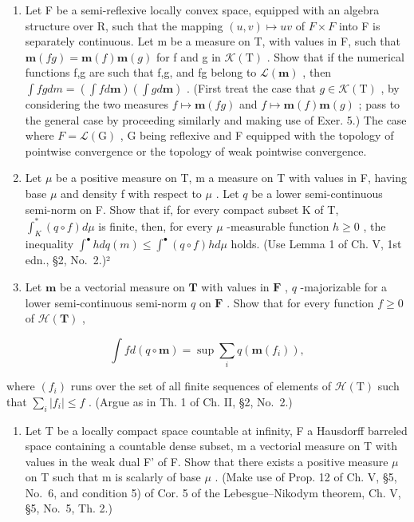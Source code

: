 \begin{enumerate}
\item
  Let F be a semi-reflexive locally convex space, equipped with an algebra structure over R, such that the mapping \((u,v)\mapsto uv\) of \(F\times F\) into F is separately continuous. Let m be a measure on T, with values in F, such that \(\mathbf{m}(fg)=\mathbf{m}(f)\mathbf{m}(g)\) for f and g in \(\mathcal{K}(\mathrm{T})\) . Show that if the numerical functions f,g are such that f,g, and fg belong to \(\mathcal{L}(\mathbf{m})\) , then \(\int fg dm=(\int fd\mathbf{m})(\int gd\mathbf{m})\) . (First treat the case that \(g\in\mathcal{K}(\mathrm{T})\) , by considering the two measures \(f\mapsto\mathbf{m}(fg)\) and \(f\mapsto\mathbf{m}(f)\mathbf{m}(g)\) ; pass to the general case by proceeding similarly and making use of Exer. 5.) The case where \(F=\mathcal{L}(\mathrm{G})\) , G being reflexive and F equipped with the topology of pointwise convergence or the topology of weak pointwise convergence.
\item
  Let \(\mu\) be a positive measure on T, m a measure on T with values in F, having base \(\mu\) and density f with respect to \(\mu\) . Let \(q\) be a lower semi-continuous semi-norm on F. Show that if, for every compact subset K of T, \(\int_{K}^{*}(q \circ f) d\mu\) is finite, then, for every \(\mu\) -measurable function \(h \geqslant 0\) , the inequality \(\int^{\bullet} h dq(m) \leqslant \int^{\bullet} (q \circ f) h d\mu\) holds. (Use Lemma 1 of Ch. V, 1st edn., §2, No.~2.)²
\item
  Let \(\mathbf{m}\) be a vectorial measure on \(\mathbf{T}\) with values in \(\mathbf{F}\) , \(q\) -majorizable for a lower semi-continuous semi-norm \(q\) on \(\mathbf{F}\) . Show that for every function \(f \geqslant 0\) of \(\mathcal{H}(\mathbf{T})\) ,
\end{enumerate}

\[
\int f d (q \circ \mathbf {m}) = \sup \sum_ {i} q (\mathbf {m} (f _ {i})),
\]

where \((f_i)\) runs over the set of all finite sequences of elements of \(\mathcal{H}(\mathrm{T})\) such that \(\sum_{i}|f_i| \leqslant f\) . (Argue as in Th. 1 of Ch. II, §2, No.~2.)

\begin{enumerate}
\def\labelenumi{\arabic{enumi})}
\setcounter{enumi}{8}
\tightlist
\item
  Let T be a locally compact space countable at infinity, F a Hausdorff barreled space containing a countable dense subset, m a vectorial measure on T with values in the weak dual F' of F. Show that there exists a positive measure \(\mu\) on T such that m is scalarly of base \(\mu\) . (Make use of Prop. 12 of Ch. V, §5, No.~6, and condition 5) of Cor. 5 of the Lebesgue--Nikodym theorem, Ch. V, §5, No.~5, Th. 2.)
\end{enumerate}

